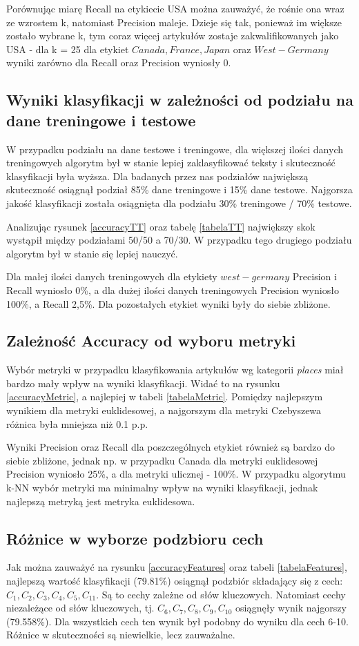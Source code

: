 \documentclass{classrep}
\begin{document}
Porównując miarę Recall na etykiecie USA można zauważyć, że rośnie ona wraz ze wzrostem k, natomiast Precision maleje. Dzieje się tak, ponieważ im większe zostało wybrane k, tym coraz więcej artykułów zostaje zakwalifikowanych jako USA - dla k = 25 dla etykiet $Canada, France, Japan$ oraz $West-Germany$ wyniki zarówno dla Recall oraz Precision wyniosły 0.
\subsection{Wyniki klasyfikacji w zależności od podziału na dane treningowe i testowe}
W przypadku podziału na dane testowe i treningowe, dla większej ilości danych treningowych algorytm był w stanie lepiej zaklasyfikować teksty i skuteczność klasyfikacji była wyższa. Dla badanych przez nas podziałów największą skuteczność osiągnął podział 85\% dane treningowe i 15\% dane testowe. Najgorsza jakość klasyfikacji została osiągnięta dla podziału 30\% treningowe / 70\% testowe. 

Analizując rysunek \ref{accuracyTT} oraz tabelę \ref{tabelaTT} największy skok wystąpił między podziałami 50/50 a 70/30. W przypadku tego drugiego podziału algorytm był w stanie się lepiej nauczyć.

Dla małej ilości danych treningowych dla etykiety $west-germany$ Precision i Recall wyniosło 0\%, a dla dużej ilości danych treningowych Precision wyniosło 100\%, a Recall 2,5\%. Dla pozostałych etykiet wyniki były do siebie zbliżone.
\subsection{Zależność Accuracy od wyboru metryki}
Wybór metryki w przypadku klasyfikowania artykułów wg kategorii \textsl{places} miał bardzo mały wpływ na wyniki klasyfikacji. Widać to na rysunku \ref{accuracyMetric}, a najlepiej w tabeli \ref{tabelaMetric}. Pomiędzy najlepszym wynikiem dla metryki euklidesowej, a najgorszym dla metryki Czebyszewa różnica była mniejsza niż 0.1 p.p. 

Wyniki Precision oraz Recall dla poszczególnych etykiet również są bardzo do siebie zbliżone, jednak np. w przypadku Canada dla metryki euklidesowej Precision wyniosło 25\%, a dla metryki ulicznej - 100\%. W przypadku algorytmu k-NN wybór metryki ma minimalny wpływ na wyniki klasyfikacji, jednak najlepszą metryką jest metryka euklidesowa.
\subsection{Różnice w wyborze podzbioru cech}
Jak można zauważyć na rysunku \ref{accuracyFeatures} oraz tabeli \ref{tabelaFeatures}, najlepszą wartość klasyfikacji (79.81\%) osiągnął podzbiór składający się z cech: $C_1, C_2, C_3, C_4, C_5, C_{11}$. Są to cechy zależne od słów kluczowych. Natomiast cechy niezależące od słów kluczowych, tj. $C_6, C_7, C_8, C_9, C_{10}$ osiągnęły wynik najgorszy (79.558\%). Dla wszystkich cech ten wynik był podobny do wyniku dla cech 6-10. Różnice w skuteczności są niewielkie, lecz zauważalne. 
\end{document}

